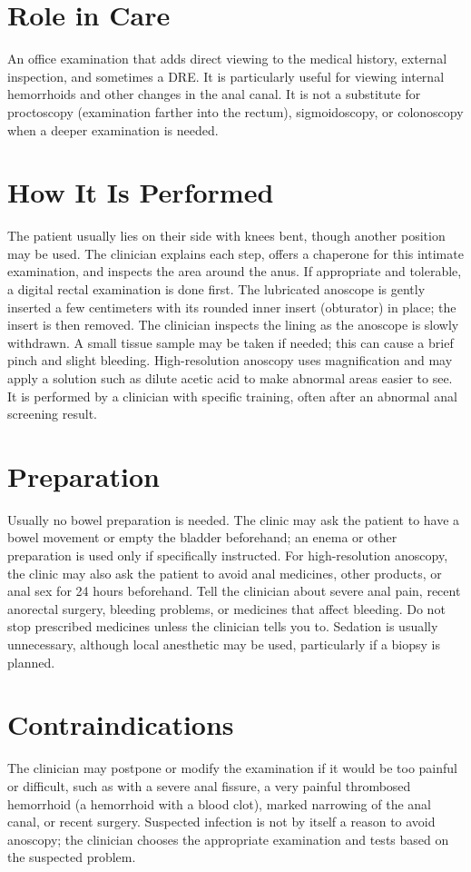 \section*{Role in Care}
An office examination that adds direct viewing to the medical history, external inspection, and sometimes a DRE. It is particularly useful for viewing internal hemorrhoids and other changes in the anal canal. It is not a substitute for proctoscopy (examination farther into the rectum), sigmoidoscopy, or colonoscopy when a deeper examination is needed.

\section*{How It Is Performed}
The patient usually lies on their side with knees bent, though another position may be used. The clinician explains each step, offers a chaperone for this intimate examination, and inspects the area around the anus. If appropriate and tolerable, a digital rectal examination is done first. The lubricated anoscope is gently inserted a few centimeters with its rounded inner insert (obturator) in place; the insert is then removed. The clinician inspects the lining as the anoscope is slowly withdrawn. A small tissue sample may be taken if needed; this can cause a brief pinch and slight bleeding. High-resolution anoscopy uses magnification and may apply a solution such as dilute acetic acid to make abnormal areas easier to see. It is performed by a clinician with specific training, often after an abnormal anal screening result.

\section*{Preparation}
Usually no bowel preparation is needed. The clinic may ask the patient to have a bowel movement or empty the bladder beforehand; an enema or other preparation is used only if specifically instructed. For high-resolution anoscopy, the clinic may also ask the patient to avoid anal medicines, other products, or anal sex for 24 hours beforehand. Tell the clinician about severe anal pain, recent anorectal surgery, bleeding problems, or medicines that affect bleeding. Do not stop prescribed medicines unless the clinician tells you to. Sedation is usually unnecessary, although local anesthetic may be used, particularly if a biopsy is planned.

\section*{Contraindications}
The clinician may postpone or modify the examination if it would be too painful or difficult, such as with a severe anal fissure, a very painful thrombosed hemorrhoid (a hemorrhoid with a blood clot), marked narrowing of the anal canal, or recent surgery. Suspected infection is not by itself a reason to avoid anoscopy; the clinician chooses the appropriate examination and tests based on the suspected problem.

